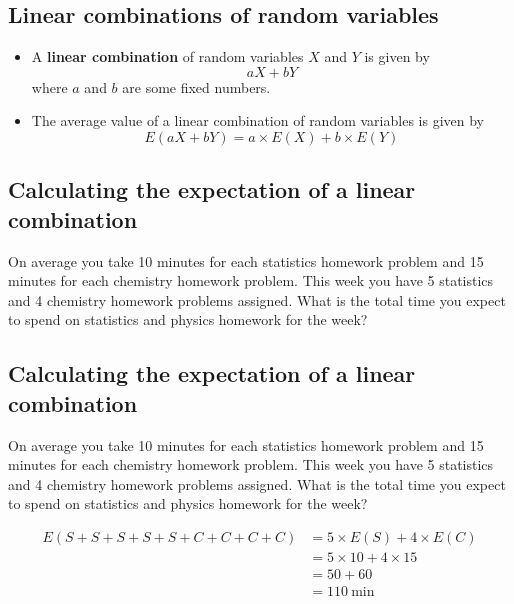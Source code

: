\documentclass[
]{article}
\providecommand{\tightlist}{%
  \setlength{\itemsep}{0pt}\setlength{\parskip}{0pt}}
\begin{document}
\hypertarget{linear-combinations-of-random-variables-1}{%
\subsection{Linear combinations of random
variables}\label{linear-combinations-of-random-variables-1}}

\begin{itemize}
\tightlist
\item
  A \textbf{linear combination} of random variables \(X\) and \(Y\) is
  given by \[
  aX + bY 
  \] where \(a\) and \(b\) are some fixed numbers.
\item
  The average value of a linear combination of random variables is given
  by \[
  E(aX + bY) = a \times E(X) + b \times E(Y)
  \]
\end{itemize}

\hypertarget{calculating-the-expectation-of-a-linear-combination}{%
\subsection{Calculating the expectation of a linear
combination}\label{calculating-the-expectation-of-a-linear-combination}}

On average you take 10 minutes for each statistics homework problem and
15 minutes for each chemistry homework problem. This week you have 5
statistics and 4 chemistry homework problems assigned. What is the total
time you expect to spend on statistics and physics homework for the
week?

\hypertarget{calculating-the-expectation-of-a-linear-combination-1}{%
\subsection{Calculating the expectation of a linear
combination}\label{calculating-the-expectation-of-a-linear-combination-1}}

On average you take 10 minutes for each statistics homework problem and
15 minutes for each chemistry homework problem. This week you have 5
statistics and 4 chemistry homework problems assigned. What is the total
time you expect to spend on statistics and physics homework for the
week?

\[
\begin{split}
E(S + S + S + S + S + C + C + C + C) &= 5 \times E(S) + 4 \times E(C) \\
&= 5 \times 10 + 4 \times 15 \\
&= 50 + 60 \\
&= 110~\text{min }
\end{split}
\]
\end{document}
